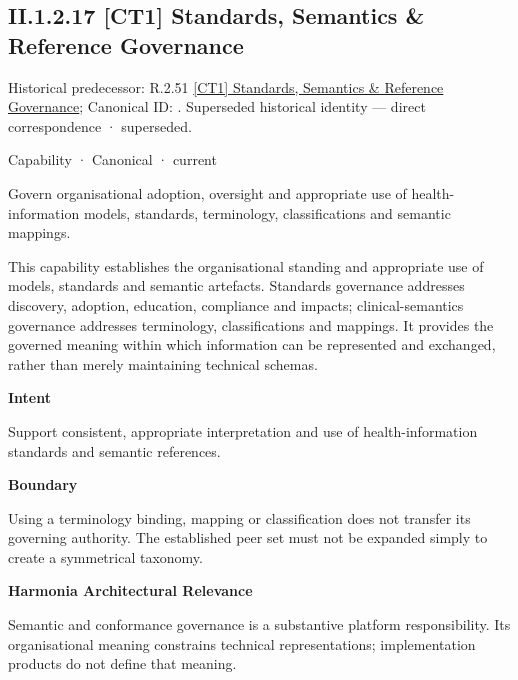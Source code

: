 \subsection*{II.1.2.17 [CT1] Standards, Semantics \& Reference Governance}
\label{navigation:II.1.2.17}

{\small Historical predecessor: R.2.51 \hyperref[element:3b65a3d007f54aa9b875e655475e1786]{[CT1] Standards, Semantics \& Reference Governance}; Canonical ID: \texttt{}. Superseded historical identity — direct correspondence · superseded.}\par
\label{element:5ffeb7401d314f06b05d79c3aff98242}
{\small Capability · Canonical · current}\par

Govern organisational adoption, oversight and appropriate use of health-information models, standards, terminology, classifications and semantic mappings.



This capability establishes the organisational standing and appropriate use of models, standards and semantic artefacts. Standards governance addresses discovery, adoption, education, compliance and impacts; clinical-semantics governance addresses terminology, classifications and mappings. It provides the governed meaning within which information can be represented and exchanged, rather than merely maintaining technical schemas.



\textbf{Intent}



Support consistent, appropriate interpretation and use of health-information standards and semantic references.



\textbf{Boundary}



Using a terminology binding, mapping or classification does not transfer its governing authority. The established peer set must not be expanded simply to create a symmetrical taxonomy.



\textbf{Harmonia Architectural Relevance}



Semantic and conformance governance is a substantive platform responsibility. Its organisational meaning constrains technical representations; implementation products do not define that meaning.


